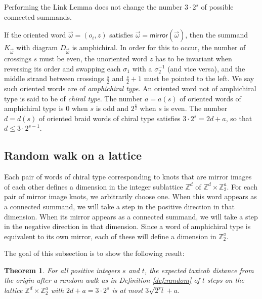 \documentclass[12pt]{amsart}
\newtheorem{theorem}{Theorem}[section]
\theoremstyle{definition}
\theoremstyle{remark}
\numberwithin{equation}{section}
\newcommand{\mirror}{\textsf{mirror}}
\begin{document}
Performing the Link Lemma does not change the number $3\cdot 2^s$ of possible connected summands.

If the oriented word $\vec{\omega}=(o_i,z)$ satisfies $\vec{\omega}=\mirror(\vec{\omega})$, then the summand $K_{\vec{\omega}}$ with diagram $D_{\vec{\omega}}$ is amphichiral.   In order for this to occur, the number of crossings $s$ must be even, the unoriented word $z$ has to be invariant when reversing its order and swapping each $\sigma_1$ with a $\sigma_2^{-1}$ (and vice versa), and the middle strand between crossings $\frac{s}{2}$ and $\frac{s}{2}+1$ must be pointed to the left. We say such oriented words are of \textit{amphichiral type}. An oriented word not of amphichiral type is said to be of \textit{chiral type}. The number $a=a(s)$ of oriented words of amphichiral type is 0 when $s$ is odd and $2^\frac{s}{2}$ when $s$ is even. The number $d=d(s)$ of oriented braid words of chiral type satisfies $3\cdot 2^s=2d+a$, so that $d\leq 3\cdot 2^{s-1}$.





\subsection{Random walk on a lattice}  \label{subsec:random} Each pair of words of chiral type corresponding to knots that are mirror images of each other defines a dimension in the integer sublattice $\mathbb{Z}^d$ of $\mathbb{Z}^d\times\mathbb{Z}_2^a$.  For each pair of mirror image knots, we arbitrarily choose one.  When this word appears as a connected summand, we will take a step in the positive direction in that dimension.  When its mirror appears as a connected summand, we will take a step in the negative direction in that dimension.  Since a word of amphichiral type is equivalent to its own mirror, each of these will define a dimension in $\mathbb{Z}^a_2$.

The goal of this subsection is to show the following result:

\begin{theorem}
\label{thm:taxicab}
For all positive integers $s$ and $t$, the expected taxicab distance from the origin after a random walk as in Definition \ref{def:random} of $t$ steps on the lattice $\mathbb{Z}^d\times\mathbb{Z}_2^a$ with $2d+a=3\cdot 2^s$ is at most $3\sqrt{2^s t} +a$.
\end{theorem}
\end{document}
